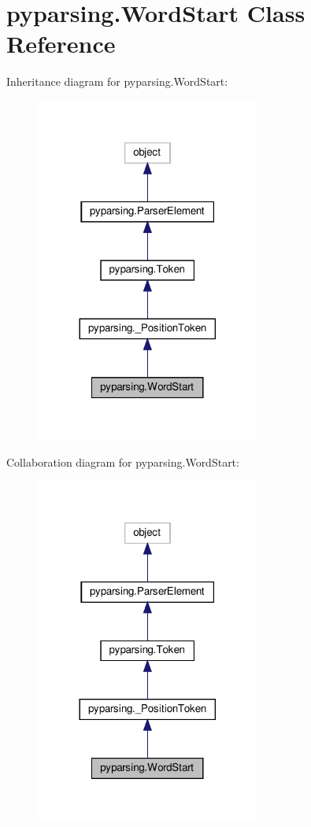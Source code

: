 \hypertarget{classpyparsing_1_1WordStart}{}\section{pyparsing.\+Word\+Start Class Reference}
\label{classpyparsing_1_1WordStart}


Inheritance diagram for pyparsing.\+Word\+Start\+:
\nopagebreak
\begin{figure}[H]
\begin{center}
\leavevmode
\includegraphics[width=209pt]{classpyparsing_1_1WordStart__inherit__graph}
\end{center}
\end{figure}


Collaboration diagram for pyparsing.\+Word\+Start\+:
\nopagebreak
\begin{figure}[H]
\begin{center}
\leavevmode
\includegraphics[width=209pt]{classpyparsing_1_1WordStart__coll__graph}
\end{center}
\end{figure}

